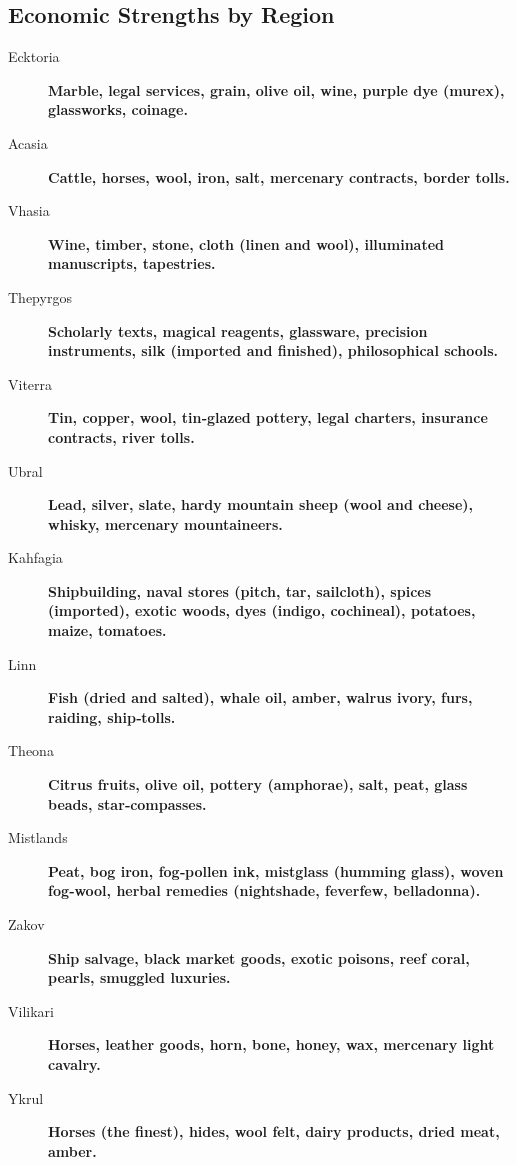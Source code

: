 \subsection*{Economic Strengths by Region}
\label{subsec:economic-strengths}

\begin{description}
\item[Ecktoria] \textbf{Marble, legal services, grain, olive oil, wine, purple dye (murex), glassworks, coinage.}
\item[Acasia] \textbf{Cattle, horses, wool, iron, salt, mercenary contracts, border tolls.}
\item[Vhasia] \textbf{Wine, timber, stone, cloth (linen and wool), illuminated manuscripts, tapestries.}
\item[Thepyrgos] \textbf{Scholarly texts, magical reagents, glassware, precision instruments, silk (imported and finished), philosophical schools.}
\item[Viterra] \textbf{Tin, copper, wool, tin‑glazed pottery, legal charters, insurance contracts, river tolls.}
\item[Ubral] \textbf{Lead, silver, slate, hardy mountain sheep (wool and cheese), whisky, mercenary mountaineers.}
\item[Kahfagia] \textbf{Shipbuilding, naval stores (pitch, tar, sailcloth), spices (imported), exotic woods, dyes (indigo, cochineal), potatoes, maize, tomatoes.}
\item[Linn] \textbf{Fish (dried and salted), whale oil, amber, walrus ivory, furs, raiding, ship‑tolls.}
\item[Theona] \textbf{Citrus fruits, olive oil, pottery (amphorae), salt, peat, glass beads, star‑compasses.}
\item[Mistlands] \textbf{Peat, bog iron, fog‑pollen ink, mistglass (humming glass), woven fog‑wool, herbal remedies (nightshade, feverfew, belladonna).}
\item[Zakov] \textbf{Ship salvage, black market goods, exotic poisons, reef coral, pearls, smuggled luxuries.}
\item[Vilikari] \textbf{Horses, leather goods, horn, bone, honey, wax, mercenary light cavalry.}
\item[Ykrul] \textbf{Horses (the finest), hides, wool felt, dairy products, dried meat, amber.}
\end{description}


